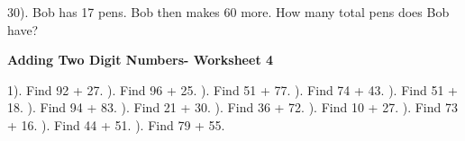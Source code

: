 \documentclass{article}%
\begin{document}
30). Bob has 17 pens. Bob then makes 60 more. How many total pens does Bob have?%
\newline%
\newline%
\newline%
\pagebreak%
\large%
\begin{center}%
\textbf{Adding Two Digit Numbers- Worksheet 4}%
\newline%
\newline%
\newline%
\end{center} \normalsize%
1). Find 92 + 27.%
\newline%
\newline%
). Find 96 + 25.%
\newline%
\newline%
). Find 51 + 77.%
\newline%
\newline%
). Find 74 + 43.%
\newline%
\newline%
). Find 51 + 18.%
\newline%
\newline%
). Find 94 + 83.%
\newline%
\newline%
). Find 21 + 30.%
\newline%
\newline%
). Find 36 + 72.%
\newline%
\newline%
). Find 10 + 27.%
\newline%
\newline%
). Find 73 + 16.%
\newline%
\newline%
). Find 44 + 51.%
\newline%
\newline%
). Find 79 + 55.%
\newline%
\newline%
\newline%
\end{document}
